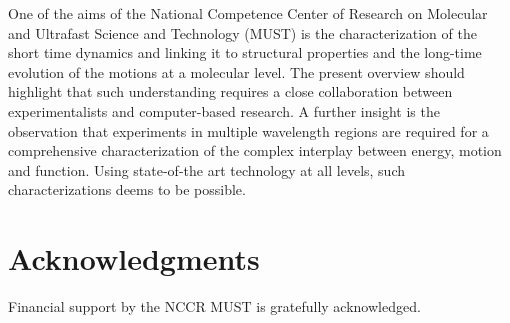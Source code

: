 \documentclass[journal=jacsat,manuscript=article]{achemso}
\begin{document}
One of the aims of the National Competence Center of Research on
Molecular and Ultrafast Science and Technology (MUST) is the
characterization of the short time dynamics and linking it to
structural properties and the long-time evolution of the motions at a
molecular level. The present overview should highlight that such
understanding requires a close collaboration between experimentalists
and computer-based research. A further insight is the observation that
experiments in multiple wavelength regions are required for a
comprehensive characterization of the complex interplay between
energy, motion and function. Using state-of-the art technology at all
levels, such characterizations deems to be possible.

\section*{Acknowledgments}
Financial support by the NCCR MUST is gratefully acknowledged.



\end{document}
